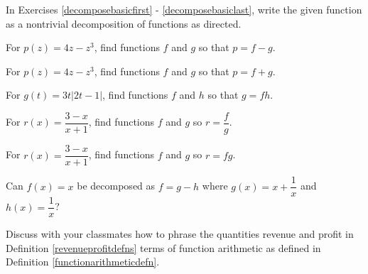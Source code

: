 \documentclass{ximera}
\begin{document}
\begin{question}
In Exercises \ref{decomposebasicfirst} - \ref{decomposebasiclast}, write the given function as a nontrivial decomposition of functions as directed.

\begin{problem}\label{decomposebasicfirst}
For $p(z) = 4z-z^3$, find functions $f$ and $g$ so that $p=f-g$.
\end{problem}
  
\begin{problem}
For $p(z) = 4z-z^3$, find functions $f$ and $g$ so that $p=f+g$.
\end{problem} 

\begin{problem}
For $g(t) = 3t|2t-1|$, find functions $f$ and $h$  so that $g = fh$.
\end{problem}

\begin{problem}
For $r(x) = \dfrac{3-x}{x+1}$, find functions $f$ and $g$ so $r = \dfrac{f}{g}$.
\end{problem} 

\begin{problem}\label{decomposebasiclast}
For $r(x) = \dfrac{3-x}{x+1}$, find functions $f$ and $g$ so $r = fg$.
\end{problem} 



\end{question}

\begin{problem}
Can $f(x) = x$ be decomposed as $f = g-h$ where $g(x) = x+\dfrac{1}{x}$ and $h(x) = \dfrac{1}{x}$? 
\end{problem}

\begin{problem}
Discuss with your classmates how to phrase the quantities revenue and profit in Definition \ref{revenueprofitdefns} terms of function arithmetic as defined in Definition \ref{functionarithmeticdefn}.
\end{problem}
\end{document}
